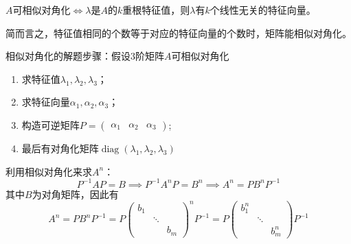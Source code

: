 \begin{theorem}
    $A$可相似对角化$\iff \lambda$是$A$的$k$重根特征值，则$\lambda$有$k$个线性无关的特征向量。
\end{theorem}
简而言之，特征值相同的个数等于对应的特征向量的个数时，矩阵能相似对角化。

相似对角化的解题步骤：假设$3$阶矩阵$A$可相似对角化
\begin{enumerate}[(1)]
    \item 求特征值$\lambda_1, \lambda_2, \lambda_3$；
    \item 求特征向量$\alpha_1,\alpha_2,\alpha_3$；
    \item 构造可逆矩阵$P=\begin{pmatrix} \alpha_1 & \alpha_2& \alpha_3 \end{pmatrix}$;
    \item 最后有对角化矩阵$\operatorname{diag}(\lambda_1,\lambda_2,\lambda_3)$
\end{enumerate}

利用相似对角化来求$A^n$：
\[
    P^{-1}AP = B \implies    P^{-1}A^nP = B^n \implies A^n = PB^nP^{-1}
\]
其中$B$为对角矩阵，因此有
\begin{equation}
    A^n = PB^nP^{-1} =
    P
    \begin{pmatrix}
        b_1 &        &     \\
            & \ddots &     \\
            &        & b_m
    \end{pmatrix}^nP^{-1}
    =P
    \begin{pmatrix}
        b_1^n &        &       \\
              & \ddots &       \\
              &        & b_m^n
    \end{pmatrix}P^{-1}
\end{equation}

